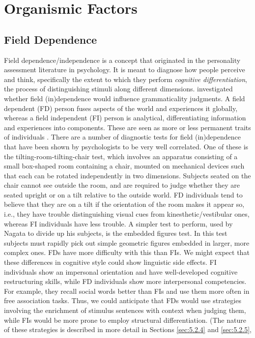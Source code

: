 \section{Organismic Factors}\label{sec:4.3}
\subsection{Field Dependence} \label{sec:4.3.1}

Field dependence/independence is a concept that originated in the personality assessment literature in psychology. It is meant to diagnose how people perceive and think, specifically the extent to which they perform \textit{cognitive differentiation}, the process of distinguishing stimuli along different dimensions. \citet{Nagata1989b} investigated whether field (in)dependence would influence grammaticality judgments. A field dependent (FD) person fuses aspects of the world and experiences it globally, whereas a field independent (FI) person is analytical, differentiating information and experiences into components. These are seen as more or less permanent traits of individuals \citep{WeinerEtAl1977}. There are a number of diagnostic tests for field (in)dependence that have been shown by psychologists to be very well correlated. One of these is the tilting-room-tilting-chair test, which involves an apparatus consisting of a small box-shaped room containing a chair, mounted on mechanical devices such that each can be rotated independently in two dimensions. Subjects seated on the chair cannot see outside the room, and are required to judge whether they are seated upright or on a tilt relative to the outside world. FD individuals tend to believe that they are on a tilt if the orientation of the room makes it appear so, i.e., they have trouble distinguishing visual cues from kinesthetic/vestibular ones, whereas FI individuals have less trouble. A simpler test to perform, used by Nagata to divide up his subjects, is the embedded figures test. In this test subjects must rapidly pick out simple geometric figures embedded in larger, more complex ones. FDs have more difficulty with this than FIs. We might expect that these differences in cognitive style could show linguistic side effects. FI individuals show an impersonal orientation and have well-developed cognitive restructuring skills, while FD individuals show more interpersonal competencies. For
example, they recall social words better than FIs and use them more often in free association tasks. Thus, we could anticipate that FDs would use strategies involving the enrichment of stimulus sentences with context when judging them, while FIs would be more prone to employ structural differentiation. (The nature of these strategies is described in more detail in Sections \ref{sec:5.2.4} and \ref{sec:5.2.5},
